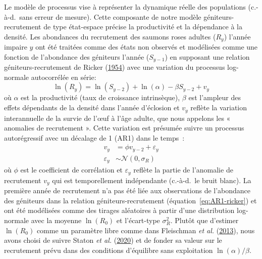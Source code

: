 \documentclass[french,11pt]{book}
\begin{document}
Le modèle de processus vise à représenter la dynamique réelle des populations (c.-à-d.~sans erreur de mesure). Cette composante de notre modèle géniteurs-recrutement de type état-espace précise la productivité et la dépendance à la densité. Les abondances du recrutement des saumons roses adultes (\(R_y\)) l'année impaire \(y\) ont été traitées comme des états non observés et modélisées comme une fonction de l'abondance des géniteurs l'année (\(S_{y-1}\)) en supposant une relation géniteurs-recrutement de Ricker (\protect\hyperlink{ref-rickerStockRecruitment1954}{1954}) avec une variation du processus log-normale autocorrélée en série:
\begin{equation}
\ln(R_y) = \ln(S_{y-2}) + \ln(\alpha) - \beta S_{y-2} + v_y
\label{eq:AR1-ricker}
\end{equation}
où \(\alpha\) est la productivité (taux de croissance intrinsèque), \(\beta\) est l'ampleur des effets dépendants de la densité dans l'année d'éclosion et \(v_y\) reflète la variation interannuelle de la survie de l'œuf à l'âge adulte, que nous appelons les « anomalies de recrutement ». Cette variation est présumée suivre un processus autorégressif avec un décalage de 1 (AR1) dans le temps~:
\begin{equation}
\begin{aligned}
v_y &= \phi v_{y-2} + \varepsilon_y \\
\varepsilon_y &\sim \mathcal{N}(0, \sigma_R)
\end{aligned}
\label{eq:AR1}
\end{equation}
où \(\phi\) est le coefficient de corrélation et \(\varepsilon_y\) reflète la partie de l'anomalie de recrutement \(v_y\) qui est temporellement indépendante (c.-à-d.~le bruit blanc). La première année de recrutement n'a pas été liée aux observations de l'abondance des géniteurs dans la relation géniteurs-recrutement (équation~\ref{eq:AR1-ricker}) et ont été modélisées comme des tirages aléatoires à partir d'une distribution log-normale avec la moyenne \(\ln(R_0)\) et l'écart-type \(\sigma_{R}^2\). Plutôt que d'estimer \(\ln(R_0)\) comme un paramètre libre comme dans Fleischman \emph{et al.} (\protect\hyperlink{ref-fleischmanAgestructuredStatespaceStock2013}{2013}), nous avons choisi de suivre Staton \emph{et al.} (\protect\hyperlink{ref-statonEvaluationMethodsSpawner2020}{2020}) et de fonder sa valeur sur le recrutement prévu dans des conditions d'équilibre sans exploitation \(\ln(\alpha)/\beta\).
\end{document}
